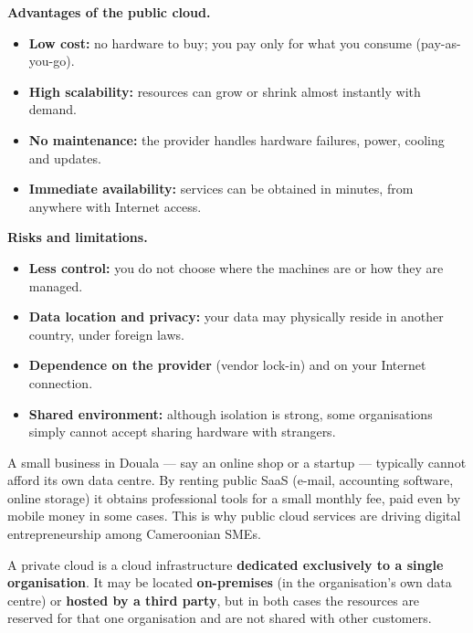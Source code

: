 \documentclass[11pt]{article}
\newcommand{\cle}[1]{{\popxbold\color{popdark}#1}}
\newcounter{popsec}
\newcounter{popsub}
\newcommand{\courssub}[1]{%
  \stepcounter{popsub}%
  \par\vspace{9pt}\noindent{\popxbold\fontsize{11.5}{13}\selectfont\color{popink}{\color{poporange}\thepopsec.\thepopsub}\hspace{6pt}#1}\par\nopagebreak\vspace{4pt}
}
\begin{document}
\textbf{Advantages of the public cloud.}
\begin{itemize}
\item \textbf{Low cost:} no hardware to buy; you pay only for what you consume (pay-as-you-go).
\item \textbf{High scalability:} resources can grow or shrink almost instantly with demand.
\item \textbf{No maintenance:} the provider handles hardware failures, power, cooling and updates.
\item \textbf{Immediate availability:} services can be obtained in minutes, from anywhere with Internet access.
\end{itemize}

\textbf{Risks and limitations.}
\begin{itemize}
\item \textbf{Less control:} you do not choose where the machines are or how they are managed.
\item \textbf{Data location and privacy:} your data may physically reside in another country, under foreign laws.
\item \textbf{Dependence on the provider} (vendor lock-in) and on your Internet connection.
\item \textbf{Shared environment:} although isolation is strong, some organisations simply cannot accept sharing hardware with strangers.
\end{itemize}

\begin{savaistu}
A small business in Douala --- say an online shop or a startup --- typically cannot afford its own data centre. By renting public SaaS (e-mail, accounting software, online storage) it obtains professional tools for a small monthly fee, paid even by mobile money in some cases. This is why public cloud services are driving digital entrepreneurship among Cameroonian SMEs.
\end{savaistu}

\courssub{The Private Cloud}

\begin{definition}
A \cle{private cloud} is a cloud infrastructure \textbf{dedicated exclusively to a single organisation}. It may be located \textbf{on-premises} (in the organisation's own data centre) or \textbf{hosted by a third party}, but in both cases the resources are reserved for that one organisation and are not shared with other customers.
\end{definition}
\end{document}
